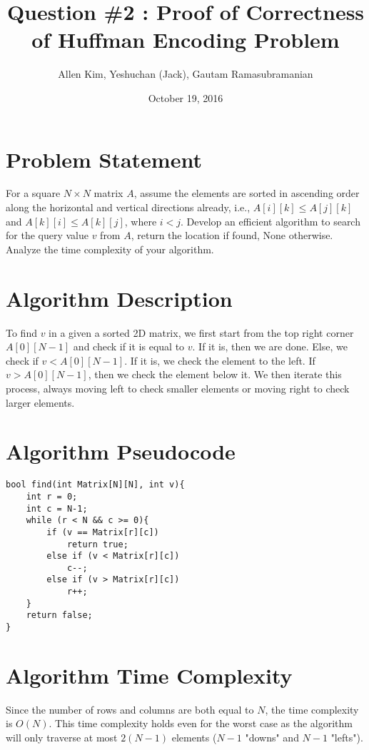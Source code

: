 \documentclass{article}
\title{Question \#2 : Proof of Correctness of Huffman Encoding Problem}
\author{Allen Kim, Yeshuchan (Jack), Gautam Ramasubramanian}
\date{October 19, 2016}
\begin{document}
\maketitle

\section*{Problem Statement}

For a square $N \times N$ matrix $A$, assume the elements are sorted in ascending order along the horizontal and vertical directions already, i.e., $A[i][k] \le A[j][k]$ and $A[k][i] \le A[k][j]$, where $i<j$. Develop an efficient algorithm to search for the query value $v$ from $A$, return the location if found, None otherwise. Analyze the time complexity of your algorithm.

\section*{Algorithm Description}

To find $v$ in a given a sorted 2D matrix, we first start from the top right corner $A[0][N-1]$ and check if it is equal to $v$. If it is, then we are done. Else, we check if $v < A[0][N-1]$. If it is, we check the element to the left. If $v > A[0][N-1]$, then we check the element below it. We then iterate this process, always moving left to check smaller elements or moving right to check larger elements.

\section*{Algorithm Pseudocode}

\begin{verbatim}
bool find(int Matrix[N][N], int v){
    int r = 0;
    int c = N-1;
    while (r < N && c >= 0){
        if (v == Matrix[r][c])
	        return true;
        else if (v < Matrix[r][c])
            c--;
        else if (v > Matrix[r][c])
            r++;
    }
    return false;
}
\end{verbatim}

\section*{Algorithm Time Complexity}

Since the number of rows and columns are both equal to $N$, the time complexity is $O(N)$. This time complexity holds even for the worst case as the algorithm will only traverse at most $2(N-1)$ elements ($N-1$ "downs" and $N-1$ "lefts").
\end{document}
